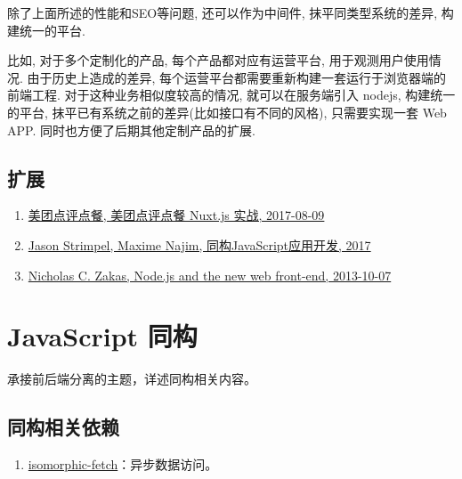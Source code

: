 除了上面所述的性能和SEO等问题, 还可以作为中间件, 抹平同类型系统的差异,
构建统一的平台.

比如, 对于多个定制化的产品, 每个产品都对应有运营平台,
用于观测用户使用情况. 由于历史上造成的差异,
每个运营平台都需要重新构建一套运行于浏览器端的前端工程.
对于这种业务相似度较高的情况, 就可以在服务端引入 nodejs, 构建统一的平台,
抹平已有系统之前的差异(比如接口有不同的风格), 只需要实现一套 Web APP.
同时也方便了后期其他定制产品的扩展.

\subsection{扩展}\label{ux6269ux5c55-1}

\begin{enumerate}
\def\labelenumi{\arabic{enumi}.}
\tightlist
\item
  \href{https://juejin.im/post/598aabe96fb9a03c335a8dde}{美团点评点餐,
  美团点评点餐 Nuxt.js 实战, 2017-08-09}
\item
  \href{https://book.douban.com/subject/27183584/}{Jason Strimpel,
  Maxime Najim, 同构JavaScript应用开发, 2017}
\item
  \href{https://www.nczonline.net/blog/2013/10/07/node-js-and-the-new-web-front-end/}{Nicholas
  C. Zakas, Node.js and the new web front-end, 2013-10-07}
\end{enumerate}

\section{JavaScript 同构}\label{javascript-ux540cux6784}

承接前后端分离的主题，详述同构相关内容。

\subsection{同构相关依赖}\label{ux540cux6784ux76f8ux5173ux4f9dux8d56}

\begin{enumerate}
\def\labelenumi{\arabic{enumi}.}
\tightlist
\item
  \href{https://github.com/matthew-andrews/isomorphic-fetch}{isomorphic-fetch}：异步数据访问。
\end{enumerate}
